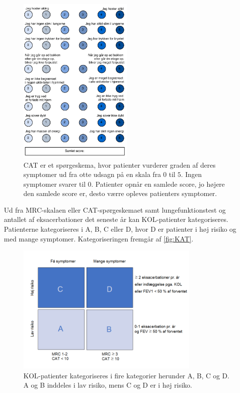 \begin{figure} [H]
\centering
\includegraphics[width=0.5\textwidth]{figures/CAT}
\caption{CAT er et spørgeskema, hvor patienter vurderer graden af deres symptomer ud fra otte udsagn på en skala fra $0$ til $5$. Ingen symptomer svarer til $0$. Patienter opnår en samlede score, jo højere den samlede score er, desto værre opleves patienters symptomer.}
\label{fig:CAT}
\end{figure} 

\noindent
Ud fra MRC-skalaen eller CAT-spørgeskemaet samt lungefunktionstest og antallet af eksacerbationer det seneste år kan KOL-patienter kategoriseres. Patienterne kategoriseres i A, B, C eller D, hvor D er patienter i høj risiko og med mange symptomer. Kategoriseringen fremgår af \autoref{fig:KAT}.

\begin{figure} [H]
\centering
\includegraphics[width=0.8\textwidth]{figures/KAT}
\caption{KOL-patienter kategoriseres i fire kategorier herunder A, B, C og D. A og B inddeles i lav risiko, mens C og D er i høj risiko.}
\label{fig:KAT}
\end{figure} 
 
